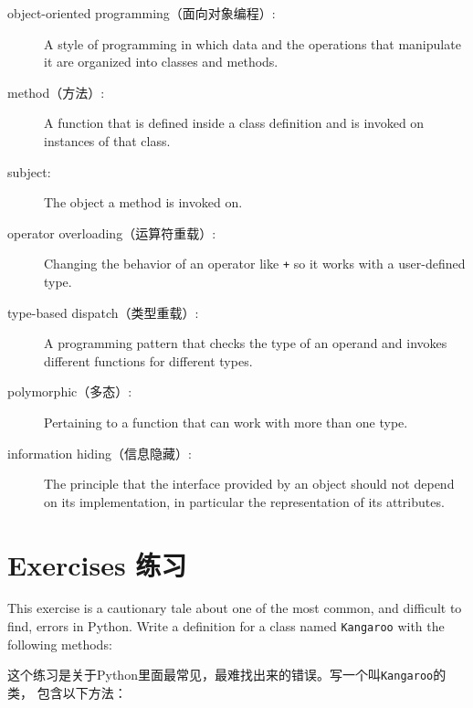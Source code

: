 \documentclass[10pt]{book}
\begin{document}
\begin{CJK}{UTF8}{gbsn}
\begin{description}
\item[object-oriented programming（面向对象编程）:] A style of programming in which
data and the operations that manipulate it are organized into classes
and methods.

\item[method（方法）:] A function that is defined inside a class definition and
is invoked on instances of that class.

\item[subject:] The object a method is invoked on.

\item[operator overloading（运算符重载）:] Changing the behavior of an operator like
{\tt +} so it works with a user-defined type.

\item[type-based dispatch（类型重载）:] A programming pattern that checks the type
of an operand and invokes different functions for different types.

\item[polymorphic（多态）:] Pertaining to a function that can work with more
  than one type.  

\item[information hiding（信息隐藏）:] The principle that the interface provided 
by an object should not depend on its implementation, in particular
the representation of its attributes.


\end{description}

\section{Exercises 练习}

\begin{exercise}

This exercise is a cautionary tale about one of the most
common, and difficult to find, errors in Python.
Write a definition for a class named {\tt Kangaroo} with the following
methods:

这个练习是关于Python里面最常见，最难找出来的错误。写一个叫{\tt Kangaroo}的类，
包含以下方法：


\end{exercise}
\end{CJK}
\end{document}
